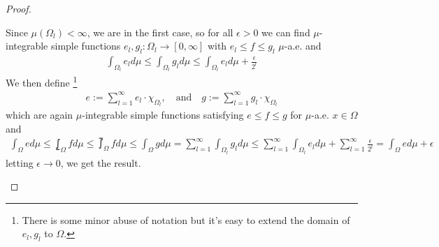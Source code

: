 \begin{proof}
\begin{itemize}
      Since $\mu(\Omega_l) < \infty$, we are in the first case, so for all $\epsilon > 0 $ we can find $\mu$-integrable simple functions $e_l,g_l: \Omega_l \to [0,\infty]$ with $e_l \leq f \leq g_l$ $\mu$-a.e. and
      \begin{align*}
        \int_{\Omega_l} e_l d \mu 
        \leq 
        \int_{\Omega_l} g_l d \mu 
        \leq
        \int_{\Omega_l} e_l d \mu + \frac{\epsilon}{2^{l}}
      \end{align*}
      We then define
      \footnote{There is some minor abuse of notation but it's easy to extend the domain of $e_l,g_l$ to $\Omega$.}
      \begin{align*}
        e := \sum_{l=1}^{\infty} e_l \cdot \chi_{\Omega_l}, 
        \quad \text{and} \quad 
        g := \sum_{l=1}^{\infty} g_l \cdot \chi_{\Omega_l}
      \end{align*}
      which are again $\mu$-integrable simple functions satisfying $e \leq f \leq g$ for $\mu$-a.e. $x \in \Omega$ and
      \begin{align*}
        \int_{\Omega}e d \mu 
        \leq 
        \lowint_{\Omega}f d \mu 
        \leq 
        \upint_{\Omega}f d \mu
        \leq
        \int_{\Omega}g d \mu 
        = 
        \sum_{l=1}^{\infty} \int_{\Omega_l}g_l d \mu 
        \leq 
        \sum_{l=1}^{\infty} \int_{\Omega_l} e_l d \mu + \sum_{l=1}^{\infty} \frac{\epsilon}{2^{l}}
        = \int_{\Omega}e d \mu + \epsilon
      \end{align*}
      letting $\epsilon \to  0$, we get the result.
  \end{itemize}
\end{proof}




